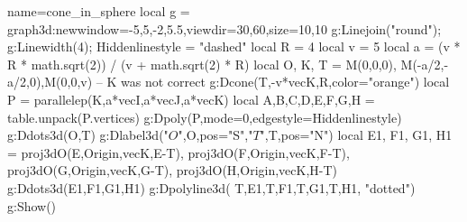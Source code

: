 \documentclass[12pt]{standalone}
\begin{document}
\begin{luadraw}{name=cone_in_sphere}
local g = graph3d:new{window={-5,5,-2,5.5},viewdir={30,60},size={10,10}}
g:Linejoin("round"); g:Linewidth(4); Hiddenlinestyle = "dashed"
local R = 4
local v = 5
local a = (v * R * math.sqrt(2)) / (v + math.sqrt(2) * R)
local O, K, T = M(0,0,0), M(-a/2,-a/2,0),M(0,0,v) -- K was not correct
g:Dcone(T,-v*vecK,R,{color="orange"})
local P = parallelep(K,a*vecI,a*vecJ,a*vecK)
local A,B,C,D,E,F,G,H = table.unpack(P.vertices)
g:Dpoly(P,{mode=0,edgestyle=Hiddenlinestyle})
g:Ddots3d({O,T})
g:Dlabel3d("$O$",O,{pos="S"},"$T$",T,{pos="N"})
local E1, F1, G1, H1 = proj3dO(E,{Origin,vecK},E-T), proj3dO(F,{Origin,vecK},F-T), proj3dO(G,{Origin,vecK},G-T), proj3dO(H,{Origin,vecK},H-T)
g:Ddots3d({E1,F1,G1,H1})
g:Dpolyline3d( {{T,E1},{T,F1},{T,G1},{T,H1}}, "dotted")
g:Show()
\end{luadraw}
\end{document}
